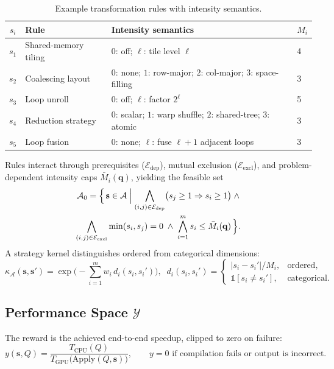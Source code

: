 \documentclass{article}
\begin{document}
\begin{table}[ht]
\centering
\small
\caption{Example transformation rules with intensity semantics.}
\label{tab:trans}
\begin{tabular}{@{}clll@{}}
\toprule
$s_i$ & \textbf{Rule} & \textbf{Intensity semantics} & $M_i$ \\
\midrule
$s_1$ & Shared-memory tiling & $0$: off; $\ell$: tile level $\ell$ & 4 \\
$s_2$ & Coalescing layout     & $0$: none; $1$: row-major; $2$: col-major; $3$: space-filling & 3 \\
$s_3$ & Loop unroll           & $0$: off; $\ell$: factor $2^{\ell}$ & 5 \\
$s_4$ & Reduction strategy    & $0$: scalar; $1$: warp shuffle; $2$: shared-tree; $3$: atomic & 3 \\
$s_5$ & Loop fusion           & $0$: none; $\ell$: fuse $\ell{+}1$ adjacent loops & 3 \\
\bottomrule
\end{tabular}
\end{table}

Rules interact through prerequisites ($\mathcal{E}_{\mathrm{dep}}$),
mutual exclusion ($\mathcal{E}_{\mathrm{excl}}$), and
problem-dependent intensity caps $\bar{M}_i(\mathbf{q})$, yielding the
feasible set
\begin{multline}
\mathcal{A}_0 = \Bigl\{\,
  \mathbf{s} \in \mathcal{A} \mathrel{\Big|}
  \bigwedge_{(i,j)\in \mathcal{E}_{\mathrm{dep}}}
    \bigl(s_j \geq 1 \Rightarrow s_i \geq 1\bigr) \;\land \\
  \bigwedge_{(i,j)\in \mathcal{E}_{\mathrm{excl}}}
    \min(s_i, s_j) = 0 \;\land\;
  \bigwedge_{i=1}^{m} s_i \leq \bar{M}_i(\mathbf{q})
\,\Bigr\}.
\label{eq:feasible}
\end{multline}
A strategy kernel distinguishes ordered from categorical dimensions:
\begin{equation}
\kappa_\mathcal{A}(\mathbf{s},\mathbf{s}')
  = \exp\!\Biggl(-\sum_{i=1}^{m} w_i \, d_i(s_i, s_i')\Biggr),\;\;
d_i(s_i, s_i') = \begin{cases}
|s_i - s_i'|/M_i, & \text{ordered},\\
\mathbb{1}[s_i \neq s_i'], & \text{categorical}.
\end{cases}
\label{eq:skernel}
\end{equation}

\subsection{Performance Space $\mathcal{Y}$}
The reward is the achieved end-to-end speedup, clipped to zero on
failure:
\begin{equation}
y(\mathbf{s}, Q) = \frac{T_{\mathrm{CPU}}(Q)}{T_{\mathrm{GPU}}\bigl(\mathrm{Apply}(Q, \mathbf{s})\bigr)},
\qquad
y = 0 \text{ if compilation fails or output is incorrect}.
\label{eq:reward}
\end{equation}
\end{document}
